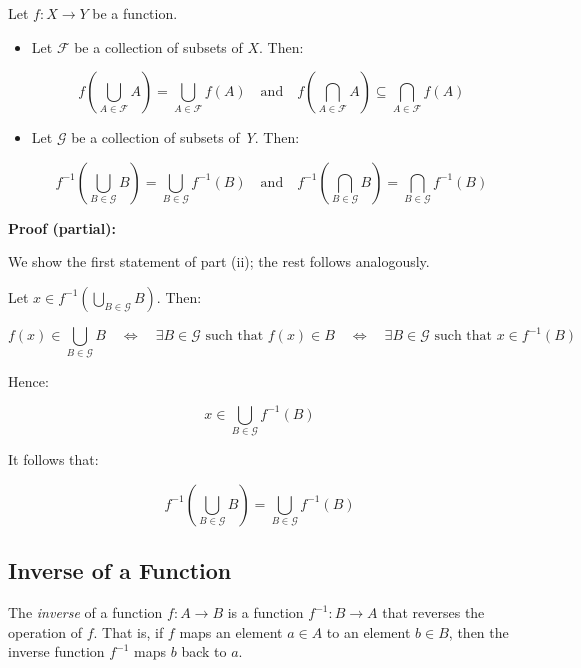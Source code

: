 Let \( f : X \to Y \) be a function.

\begin{itemize}

	\item Let \( \mathcal{F} \) be a collection of subsets of \(X\). Then:

   	      \[
		      f\left( \bigcup_{A \in \mathcal{F}} A \right) = \bigcup_{A \in \mathcal{F}} f(A)
		      \quad \text{and} \quad
		      f\left( \bigcap_{A \in \mathcal{F}} A \right) \subseteq \bigcap_{A \in \mathcal{F}} f(A)
	      \]

	\item Let \( \mathcal{G} \) be a collection of subsets of \emph{Y}. Then:

	      \[
		      f^{-1}\left( \bigcup_{B \in \mathcal{G}} B \right) = \bigcup_{B \in \mathcal{G}} f^{-1}(B)
		      \quad \text{and} \quad
		      f^{-1}\left( \bigcap_{B \in \mathcal{G}} B \right) = \bigcap_{B \in \mathcal{G}} f^{-1}(B)
	      \]

\end{itemize}

\textbf{Proof (partial):}

We show the first statement of part (ii); the rest follows analogously.

Let \( x \in f^{-1} \left( \bigcup_{B \in \mathcal{G}} B \right) \). Then:

\[
	f(x) \in \bigcup_{B \in \mathcal{G}} B
	\quad \Leftrightarrow \quad
	\exists B \in \mathcal{G} \text{ such that } f(x) \in B
	\quad \Leftrightarrow \quad
	\exists B \in \mathcal{G} \text{ such that } x \in f^{-1}(B)
\]

Hence:

\[
	x \in \bigcup_{B \in \mathcal{G}} f^{-1}(B)
\]

It follows that:

\[
	f^{-1} \left( \bigcup_{B \in \mathcal{G}} B \right) = \bigcup_{B \in \mathcal{G}} f^{-1}(B)
\]

\QED

\subsection{Inverse of a Function}

The \emph{inverse} of a function \(f: A \to B\) is a function \(f^{-1}: B \to A\) that 
reverses the operation of \(f\). That is, if \(f\) maps an element \(a \in A\) to an 
element \(b \in B\), then the inverse function \(f^{-1}\) maps \(b\) back to \(a\).

